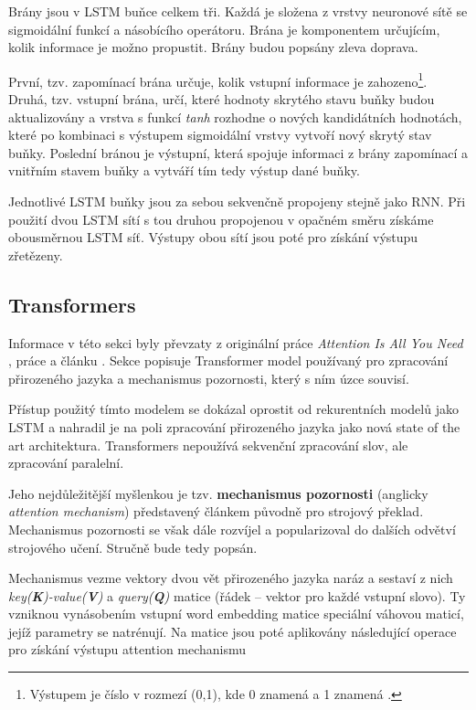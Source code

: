 Brány jsou v LSTM buňce celkem tři. Každá je složena z vrstvy neuronové sítě se sigmoidální funkcí a násobícího operátoru. Brána je komponentem určujícím, kolik informace je možno propustit. Brány budou popsány zleva doprava.\par
První, tzv. zapomínací brána určuje, kolik vstupní informace je zahozeno\footnote{Výstupem je číslo v rozmezí (0,1), kde 0 znamená  a 1 znamená .}. Druhá, tzv. vstupní brána, určí, které hodnoty skrytého stavu buňky budou aktualizovány a vrstva s funkcí \emph{tanh} rozhodne o nových kandidátních hodnotách, které po kombinaci s výstupem sigmoidální vrstvy vytvoří nový skrytý stav buňky. Poslední bránou je výstupní, která spojuje informaci z brány zapomínací a vnitřním stavem buňky a vytváří tím tedy výstup dané buňky.\par
Jednotlivé LSTM buňky jsou za sebou sekvenčně propojeny stejně jako RNN. Při použití dvou LSTM sítí s tou druhou propojenou v opačném směru získáme obousměrnou LSTM síť. Výstupy obou sítí jsou poté pro získání výstupu zřetězeny.

\subsection{Transformers}
\label{transformers}
Informace v této sekci byly převzaty z originální práce \emph{Attention Is All You Need} \cite{Transformers}, práce \cite{attention_mechanism} a článku \cite{Transformers-explained}. Sekce popisuje Transformer model používaný pro zpracování přirozeného jazyka a mechanismus pozornosti, který s ním úzce souvisí.\par
Přístup použitý tímto modelem se dokázal oprostit od rekurentních modelů jako LSTM a nahradil je na poli zpracování přirozeného jazyka jako nová state of the art architektura. Transformers nepoužívá sekvenční zpracování slov, ale zpracování paralelní.\par
Jeho nejdůležitější myšlenkou je tzv. \textbf{mechanismus pozornosti} (anglicky \emph{attention mechanism}) představený článkem \cite{attention_mechanism} původně pro strojový překlad. Mechanismus pozornosti se však dále rozvíjel a popularizoval do dalších odvětví strojového učení. Stručně bude tedy popsán.\par \medskip

Mechanismus vezme vektory dvou vět přirozeného jazyka naráz a sestaví z nich \emph{key(\textbf{K})-value(\textbf{V})} a \emph{query(\textbf{Q})} matice (řádek -- vektor pro každé vstupní slovo). Ty vzniknou vynásobením vstupní word embedding matice speciální váhovou maticí, jejíž parametry se natrénují. Na matice jsou poté aplikovány následující operace pro získání výstupu attention mechanismu

